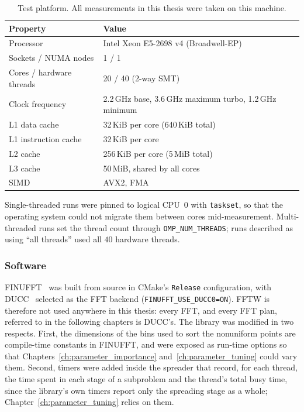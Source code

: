 \begin{table}[ht]
    \centering
    \begin{tabular}{|l|l|}
        \hline
        \textbf{Property} & \textbf{Value} \\
        \hline
        Processor & Intel Xeon E5-2698 v4 (Broadwell-EP) \\
        Sockets / NUMA nodes & 1 / 1 \\
        Cores / hardware threads & 20 / 40 (2-way SMT) \\
        Clock frequency & 2.2\,GHz base, 3.6\,GHz maximum turbo, 1.2\,GHz minimum \\
        L1 data cache & 32\,KiB per core (640\,KiB total) \\
        L1 instruction cache & 32\,KiB per core \\
        L2 cache & 256\,KiB per core (5\,MiB total) \\
        L3 cache & 50\,MiB, shared by all cores \\
        SIMD & AVX2, FMA \\
        \hline
    \end{tabular}
    \caption{Test platform. All measurements in this thesis were taken on this machine.}
    \label{tab:platform}
\end{table}

Single-threaded runs were pinned to logical CPU~0 with \texttt{taskset}, so that the operating system could not migrate them between cores mid-measurement. Multi-threaded runs set the thread count through \texttt{OMP\_NUM\_THREADS}; runs described as using ``all threads'' used all $40$ hardware threads.

\subsubsection{Software}
\label{sec:software}

FINUFFT~\cite{finufftsoftware} was built from source in CMake's \texttt{Release} configuration, with DUCC~\cite{ducc} selected as the FFT backend (\texttt{FINUFFT\_USE\_DUCC0=ON}). FFTW is therefore not used anywhere in this thesis: every FFT, and every FFT plan, referred to in the following chapters is DUCC's. The library was modified in two respects. First, the dimensions of the bins used to sort the nonuniform points are compile-time constants in FINUFFT, and were exposed as run-time options so that Chapters~\ref{ch:parameter_importance} and~\ref{ch:parameter_tuning} could vary them. Second, timers were added inside the spreader that record, for each thread, the time spent in each stage of a subproblem and the thread's total busy time, since the library's own timers report only the spreading stage as a whole; Chapter~\ref{ch:parameter_tuning} relies on them.

